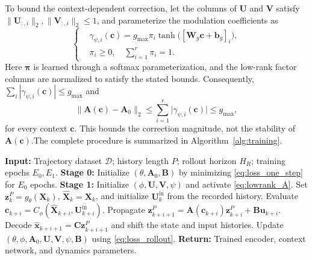 \documentclass[journal]{IEEEtran}
\newcommand{\vx}{\mathbf{x}}
\newcommand{\vu}{\mathbf{u}}
\newcommand{\vz}{\mathbf{z}}
\newcommand{\vb}{\mathbf{b}}
\newcommand{\mA}{\mathbf{A}}
\newcommand{\mB}{\mathbf{B}}
\newcommand{\mC}{\mathbf{C}}
\newcommand{\mW}{\mathbf{W}}
\newcommand{\mX}{\mathbf{X}}
\newcommand{\mU}{\mathbf{U}}
\newcommand{\mV}{\mathbf{V}}
\newcommand{\vc}{\mathbf{c}}
\begin{document}
To bound the context-dependent correction, let the columns of $\mU$ and $\mV$ satisfy $\|\mU_{:,i}\|_2,\|\mV_{:,i}\|_2\le 1$, and parameterize the modulation coefficients as
\begin{equation}
    \left\{
    \begin{aligned}
        &\gamma_{\psi,i}(\vc)=g_{\max}\pi_i\tanh\!\big([\mW_g\vc+\vb_g]_i\big),\\
        &\pi_i\ge0,\quad \sum_{i=1}^{r}\pi_i=1.
    \end{aligned}
    \right.
    \label{eq:modulation_budget}
\end{equation}
Here $\boldsymbol\pi$ is learned through a softmax parameterization, and the low-rank factor columns are normalized to satisfy the stated bounds. Consequently, $\sum_i|\gamma_{\psi,i}(\vc)|\le g_{\max}$ and
\begin{equation}
    \|\mA(\vc)-\mA_0\|_2
    \le \sum_{i=1}^{r}\big|\gamma_{\psi,i}(\vc)\big|
    \le g_{\max},
    \label{eq:correction_bound}
\end{equation}
for every context $\vc$. This bounds the correction magnitude, not the stability of $\mA(\vc)$.The complete procedure is summarized in Algorithm~\ref{alg:training}.

\begin{algorithm}[!t]
\caption{Two-Stage Transformer--Koopman Training}
\label{alg:training}
\begin{algorithmic}[1]
\STATE \textbf{Input:} Trajectory dataset $\mathcal D$; history length $P$; rollout horizon $H_R$; training epochs $E_0,E_1$.
\STATE \textbf{Stage 0:} Initialize $(\theta,\mA_0,\mB)$ by minimizing \eqref{eq:loss_one_step} for $E_0$ epochs.
\STATE \textbf{Stage 1:} Initialize $(\phi,\mU,\mV,\psi)$ and activate \eqref{eq:lowrank_A}.
        \STATE Set $\vz_k^P=g_\theta(\mX_k)$, $\hat{\mX}_k=\mX_k$, and initialize $\mU_k^{\mathrm{in}}$ from the recorded history.
            \STATE Evaluate $\vc_{k+i}=C_\phi(\hat{\mX}_{k+i},\mU_{k+i}^{\mathrm{in}})$.
            \STATE Propagate $\vz_{k+i+1}^P=\mA(\vc_{k+i})\vz_{k+i}^P+\mB\vu_{k+i}$.
            \STATE Decode $\hat{\vx}_{k+i+1}=\mC\vz_{k+i+1}^P$ and shift the state and input histories.
        \ENDFOR
        \STATE Update $(\theta,\phi,\mA_0,\mU,\mV,\psi,\mB)$ using \eqref{eq:loss_rollout}.
    \ENDFOR
\ENDFOR
\STATE \textbf{Return:} Trained encoder, context network, and dynamics parameters.
\end{algorithmic}
\end{algorithm}
\end{document}
